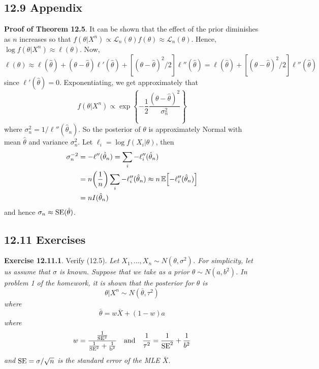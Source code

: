 \subsection*{12.9 Appendix}\label{appendix:bayesian}
\textbf{Proof of Theorem 12.5}.
It can be shown that the effect of the prior diminishes as \(n\)
increases so that
\(f(\theta | X^{n}) \propto \mathcal{L}_{n}(\theta)f(\theta) \approx \mathcal{L}_{n}(\theta)\).
Hence, \(\log f(\theta | X^{n}) \approx \ell(\theta)\). Now,
\(\ell(\theta) \approx \ell(\hat{\theta}) + (\theta - \hat{\theta})\ell'(\hat{\theta}) + [(\theta - \hat{\theta})^{2}/2]\ell''(\hat{\theta}) = \ell(\hat{\theta}) + [(\theta - \hat{\theta})^{2}/2] \ell''(\hat{\theta})\)
since \(\ell'(\hat{\theta}) = 0\). Exponentiating, we get approximately
that
\[
f(\theta | X^{n}) \propto \exp \left\{ - \frac{1}{2} \frac{(\theta - \hat{\theta})^{2}}{\sigma_{n}^{2}} \right\}
\]
where \(\sigma_{n}^{2} = 1 / \ell''(\hat{\theta}_{n})\). So the posterior of
\(\theta\) is approximately Normal with mean \(\hat{\theta}\) and
variance \(\sigma^{2}_{n}\). Let \(\ell_{i} = \log f(X_{i} | \theta)\), then
\begin{align*}
\sigma_{n}^{-2} &= -\ell''(\hat{\theta}_{n}) = \sum_{i} -\ell''_{i}(\hat{\theta}_{n}) \\
&= n \left( \frac{1}{n} \right) \sum_{i} -\ell''_{i}(\hat{\theta}_{n}) \approx n \EXP\left[-\ell''_{i}(\hat{\theta}_{n})\right] \\
&= n I(\hat{\theta}_{n})
\end{align*}
and hence \(\sigma_{n} \approx \operatorname{\mathrm{SE}} (\hat{\theta})\).

\subsection*{12.11 Exercises}

\textbf{Exercise 12.11.1}. Verify (12.5).
\emph{Let \(X_{1}, \dots, X_{n} \sim N(\theta, \sigma^{2})\). For simplicity,
let us assume that \(\sigma\) is known. Suppose that we take as a prior
\(\theta \sim N(a, b^{2})\). In problem 1 of the homework, it is shown
that the posterior for \(\theta\) is}
\[
\theta | X^{n} \sim N(\bar{\theta}, \tau^{2})
\]
\emph{where}
\[
\bar{\theta} = w \bar{X} + (1 - w) a
\]
\emph{where}
\[
w = \frac{\frac{1}{\operatorname{\mathrm{SE}} ^{2}}}{\frac{1}{\operatorname{\mathrm{SE}} ^{2}} + \frac{1}{\text{b}^{2}}} \quad \text{and} \quad \frac{1}{\tau^{2}} = \frac{1}{\operatorname{\mathrm{SE}} ^{2}} + \frac{1}{b^{2}}
\]
\emph{and \(\operatorname{\mathrm{SE}} = \sigma / \sqrt{n}\) is the standard error of the
MLE \(\bar{X}\).}

